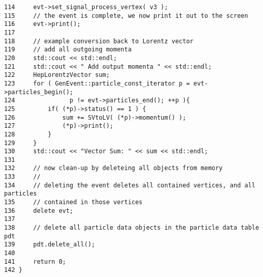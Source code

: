 \begin{DocInclude}
\begin{verbatim}
114     evt->set_signal_process_vertex( v3 );
115     // the event is complete, we now print it out to the screen
116     evt->print();
117     
118     // example conversion back to Lorentz vector
119     // add all outgoing momenta
120     std::cout << std::endl;
121     std::cout << " Add output momenta " << std::endl;
122     HepLorentzVector sum;
123     for ( GenEvent::particle_const_iterator p = evt->particles_begin(); 
124               p != evt->particles_end(); ++p ){
125         if( (*p)->status() == 1 ) {
126             sum += SVtoLV( (*p)->momentum() );
127             (*p)->print();
128         }
129     }
130     std::cout << "Vector Sum: " << sum << std::endl;
131 
132     // now clean-up by deleteing all objects from memory
133     //
134     // deleting the event deletes all contained vertices, and all particles
135     // contained in those vertices
136     delete evt;
137 
138     // delete all particle data objects in the particle data table pdt
139     pdt.delete_all();
140 
141     return 0;
142 }
\end{verbatim}
\end{DocInclude}
 